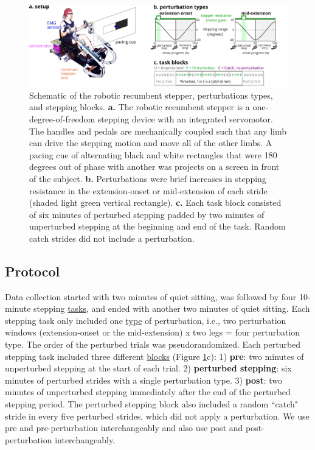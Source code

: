 \documentclass[../thesis_seyed.tex]{subfiles}
\begin{document}
\begin{figure}[bt]
      \centering
      \includegraphics[width=\linewidth]{../img/01_device_protocol.jpg}
      \caption{Schematic of the robotic recumbent stepper, perturbations types, and stepping blocks. \textbf{a.} The robotic recumbent stepper is a one-degree-of-freedom stepping device with an integrated servomotor. The handles and pedals are mechanically coupled such that any limb can drive the stepping motion and move all of the other limbs. A pacing cue of alternating black and white rectangles that were 180 degrees out of phase with another was projects on a screen in front of the subject.  \textbf{b.} Perturbations were brief increases in stepping resistance in the extension-onset or mid-extension of each stride (shaded light green vertical rectangle). \textbf{c.} Each task block consisted of six minutes of perturbed stepping padded by two minutes of unperturbed stepping at the beginning and end of the task. Random catch strides did not include a perturbation.}
      \label{fig:device}
\end{figure}

\subsection{Protocol}
Data collection started with two minutes of quiet sitting, was followed by four 10-minute stepping \underline{tasks}, and ended with another two minutes of quiet sitting. Each stepping task only included one \underline{type} of perturbation, i.e., two perturbation windows (extension-onset or the mid-extension) x two legs = four perturbation type. The order of the perturbed trials was pseudorandomized. Each perturbed stepping task included three different \underline{blocks} (Figure \ref{fig:device}c): 1) \textbf{pre}: two minutes of unperturbed stepping at the start of each trial. 2) \textbf{perturbed stepping}: six minutes of perturbed strides with a single perturbation type. 3) \textbf{post}: two minutes of unperturbed stepping immediately after the end of the perturbed stepping period.  The perturbed stepping block also included a random ``catch" stride in every five perturbed strides, which did not apply a perturbation. We use pre and pre-perturbation interchangeably and also use post and post-perturbation interchangeably.
\end{document}
